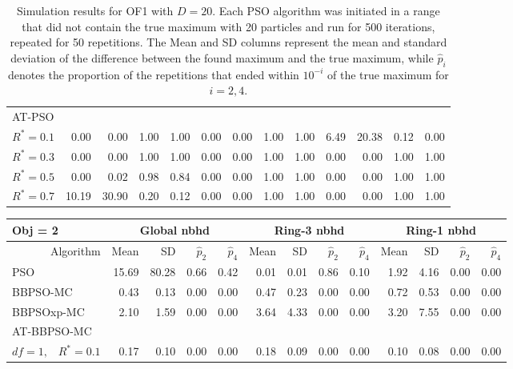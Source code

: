 \documentclass[12pt]{article}
\begin{document}
\begin{appendix}
\begin{table}[ht]
{\begin{tabular}{r|rrrr|rrrr|rrrr}
\hline
\multicolumn{1}{l|}{AT-PSO} &&&&&&&&&&&&\\
  $R^* = 0.1$ & 0.00 & 0.00 & 1.00 & 1.00 & 0.00 & 0.00 & 1.00 & 1.00 & 6.49 & 20.38 & 0.12 & 0.00 \\ 
  $R^* = 0.3$ & 0.00 & 0.00 & 1.00 & 1.00 & 0.00 & 0.00 & 1.00 & 1.00 & 0.00 & 0.00 & 1.00 & 1.00 \\ 
  $R^* = 0.5$ & 0.00 & 0.02 & 0.98 & 0.84 & 0.00 & 0.00 & 1.00 & 1.00 & 0.00 & 0.00 & 1.00 & 1.00 \\ 
  $R^* = 0.7$ & 10.19 & 30.90 & 0.20 & 0.12 & 0.00 & 0.00 & 1.00 & 1.00 & 0.00 & 0.00 & 1.00 & 1.00 \\ 
   \hline
\end{tabular}
}
\caption{Simulation results for OF1 with $D=20$. Each PSO algorithm was initiated in a range that did not contain the true maximum with 20 particles and run for 500 iterations, repeated for 50 repetitions. The Mean and SD columns represent the mean and standard deviation of the difference between the found maximum and the true maximum, while $\widehat{p}_i$ denotes the proportion of the repetitions that ended within $10^{-i}$ of the true maximum for $i=2,4$.}
\label{tab:psosim1}
\end{table}
\begin{table}[ht]
\centering
\footnotesize{
\begin{tabular}{r|rrrr|rrrr|rrrr}
\multicolumn{1}{l}{Obj = 2} & \multicolumn{4}{c}{Global nbhd} & \multicolumn{4}{c}{Ring-3 nbhd} & \multicolumn{4}{c}{Ring-1 nbhd}\\
  \hline
Algorithm & Mean & SD & $\widehat{p}_2$ & $\widehat{p}_4$ & Mean & SD & $\widehat{p}_2$ & $\widehat{p}_4$ & Mean & SD & $\widehat{p}_2$ & $\widehat{p}_4$ \\ 
  \hline
\multicolumn{1}{l|}{PSO} & 15.69 & 80.28 & 0.66 & 0.42 & 0.01 & 0.01 & 0.86 & 0.10 & 1.92 & 4.16 & 0.00 & 0.00 \\ 
  \multicolumn{1}{l|}{BBPSO-MC} & 0.43 & 0.13 & 0.00 & 0.00 & 0.47 & 0.23 & 0.00 & 0.00 & 0.72 & 0.53 & 0.00 & 0.00 \\ 
  \multicolumn{1}{l|}{BBPSOxp-MC} & 2.10 & 1.59 & 0.00 & 0.00 & 3.64 & 4.33 & 0.00 & 0.00 & 3.20 & 7.55 & 0.00 & 0.00 \\ 
\hline
\multicolumn{1}{l|}{AT-BBPSO-MC} &&&&&&&&&&&&\\
  $df = 1,\enspace$ $R^* =0.1$ & 0.17 & 0.10 & 0.00 & 0.00 & 0.18 & 0.09 & 0.00 & 0.00 & 0.10 & 0.08 & 0.00 & 0.00 \\ 

\end{tabular}}
\end{table}
\end{appendix}
\end{document}
